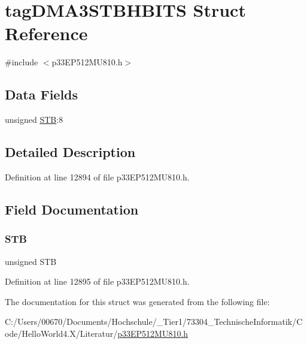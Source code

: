 \hypertarget{structtag_d_m_a3_s_t_b_h_b_i_t_s}{}\section{tag\+D\+M\+A3\+S\+T\+B\+H\+B\+I\+TS Struct Reference}
\label{structtag_d_m_a3_s_t_b_h_b_i_t_s}


{\ttfamily \#include $<$p33\+E\+P512\+M\+U810.\+h$>$}

\subsection*{Data Fields}
\begin{DoxyCompactItemize}
\item 
unsigned \hyperlink{structtag_d_m_a3_s_t_b_h_b_i_t_s_a9bd043a4db27e09b5035a563a8758fe7}{S\+TB}\+:8
\end{DoxyCompactItemize}


\subsection{Detailed Description}


Definition at line 12894 of file p33\+E\+P512\+M\+U810.\+h.



\subsection{Field Documentation}
\mbox{\label{structtag_d_m_a3_s_t_b_h_b_i_t_s_a9bd043a4db27e09b5035a563a8758fe7}} 
\subsubsection{\texorpdfstring{S\+TB}{STB}}
{\footnotesize\ttfamily unsigned S\+TB}



Definition at line 12895 of file p33\+E\+P512\+M\+U810.\+h.



The documentation for this struct was generated from the following file\+:\begin{DoxyCompactItemize}
\item 
C\+:/\+Users/00670/\+Documents/\+Hochschule/\+\_\+\+Tier1/73304\+\_\+\+Technische\+Informatik/\+Code/\+Hello\+World4.\+X/\+Literatur/\hyperlink{p33_e_p512_m_u810_8h}{p33\+E\+P512\+M\+U810.\+h}\end{DoxyCompactItemize}
